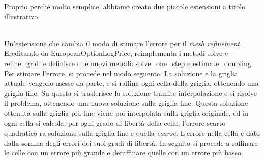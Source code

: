 \documentclass[a4paper,10pt]{report}
\theoremstyle{plain}
\theoremstyle{definition}
\theoremstyle{remark}
\begin{document}
Proprio perché molto semplice, abbiamo creato due piccole estensioni a titolo illustrativo.
\begin{description}[leftmargin=0cm]
 \item[\bf doubling\_extension] \hfill \\ Un'estensione che cambia il modo di stimare l'errore per il \emph{mesh refinement}. Ereditando da \textsf{EuropeanOptionLogPrice}, reimplementa i metodi \textsf{solve} e \textsf{refine\_grid}, e definisce due nuovi metodi: \textsf{solve\_one\_step} e \textsf{estimate\_doubling}. Per stimare l'errore, si procede nel modo seguente. La soluzione e la griglia attuale vengono messe da parte, e si raffina ogni cella della griglia, ottenendo una griglia fine. Su questa si trasferisce la soluzione tramite interpolazione e si risolve il problema, ottenendo una nuova soluzione sulla griglia fine. Questa soluzione ottenuta sulla griglia più fine viene poi interpolata sulla griglia originale, ed in ogni cella si calcola, per ogni grado di libert\`a della cella, l'errore scarto quadratico ra soluzione sulla griglia fine e quella \emph{coarse}. L'errore nella cella è dato dalla somma degli errori dei suoi gradi di libertà. In seguito si procede a raffinare le celle con un errore pi\`u grande e deraffinare quelle con un errore pi\`u basso. 
 

\end{description}
\end{document}
